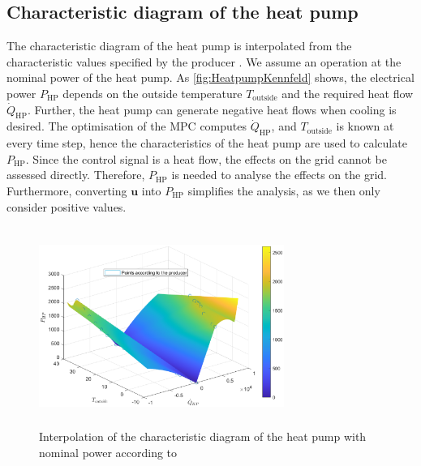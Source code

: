 \subsection{Characteristic diagram of the heat pump}
\label{subsec:charcteristicDiagramHP}
The characteristic diagram of the heat pump is interpolated from the characteristic values specified by the producer \cite{TUM}. We assume an operation at the nominal power of the heat pump. As \autoref{fig:HeatpumpKennfeld} shows, the electrical power $P_\text{HP}$ depends on the outside temperature $T_\text{outside}$ and the required heat flow $\dot{Q}_\text{HP}$. Further, the heat pump can generate negative heat flows when cooling is desired. The optimisation of the MPC computes $\dot{Q}_\text{HP}$, and $T_\text{outside}$ is known at every time step, hence the characteristics of the heat pump are used to calculate $P_\text{HP}$. Since the control signal is a heat flow, the effects on the grid cannot be assessed directly. Therefore, $P_\text{HP}$ is needed to analyse the effects on the grid. Furthermore, converting $\mathbf{u}$ into $P_\text{HP}$ simplifies the analysis, as we then only consider positive values.
    \begin{figure}[h]
            \centering
            \includegraphics[width=8cm,height=6.5cm]{figure/HeatPumpV55nenn.eps}
           \caption{Interpolation of the characteristic diagram of the heat pump with nominal power according to \cite{TUM}}
           \label{fig:HeatpumpKennfeld}
    \end{figure}
    
